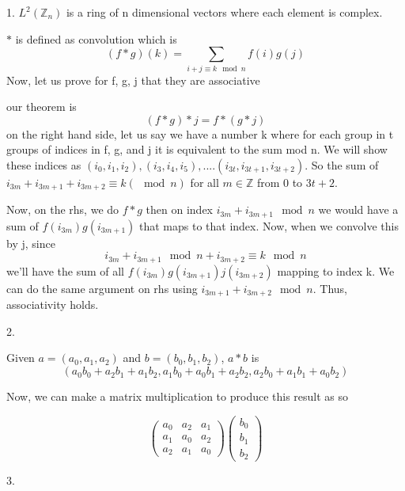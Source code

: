 \documentclass{article}
\begin{document}
1. $L^2(\mathbb{Z}_n)$ is a ring of n dimensional vectors where each element is complex.

$*$ is defined as convolution which is
\begin{equation}
	(f*g)(k)=\sum_{i+j \equiv k \mod n} f(i)g(j)
\end{equation}
Now, let us prove for f, g, j that they are associative

our theorem is
\begin{equation}
	(f*g)*j = f*(g*j)
\end{equation}
on the right hand side, let us say we have a number k where for each group in t groups of indices in f, g, and j it is equivalent to the sum mod n. We will show these indices as $(i_0, i_1, i_2), (i_3, i_4, i_5),....(i_{3t}, i_{3t+1}, i_{3t+2})$. So the sum of $i_{3m}+i_{3m+1}+i_{3m+2} \equiv k (\mod n)$ for all $m\in \mathbb{Z}$ from 0 to $3t+2$.

Now, on the rhs, we do $f*g$ then on index $i_{3m}+i_{3m+1} \mod n$ we would have a sum of $f(i_{3m})g(i_{3m+1})$ that maps to that index. Now, when we convolve this by j, since 
\begin{equation}
	i_{3m}+i_{3m+1} \mod n + i_{3m+2} \equiv k \mod n
\end{equation}
we'll have the sum of all $f(i_{3m})g(i_{3m+1})j(i_{3m+2})$ mapping to index k. We can do the same argument on rhs using $i_{3m+1}+i_{3m+2} \mod n$. Thus, associativity holds.

2.

Given $a=(a_0, a_1, a_2)$ and $b=(b_0, b_1, b_2)$, $a*b$ is
\begin{equation}
	(a_0b_0+a_2b_1+a_1b_2, a_1b_0+a_0b_1+a_2b_2, a_2b_0+a_1b_1+a_0b_2)
\end{equation}

Now, we can make a matrix multiplication to produce this result as so

\begin{equation}
	\begin{pmatrix}
		a_0 & a_2 & a_1 \\
		a_1 & a_0 & a_2 \\
		a_2 & a_1 & a_0
	\end{pmatrix}
	\begin{pmatrix}
		b_0 \\
		b_1 \\
		b_2
	\end{pmatrix}
\end{equation}

3.
\end{document}
